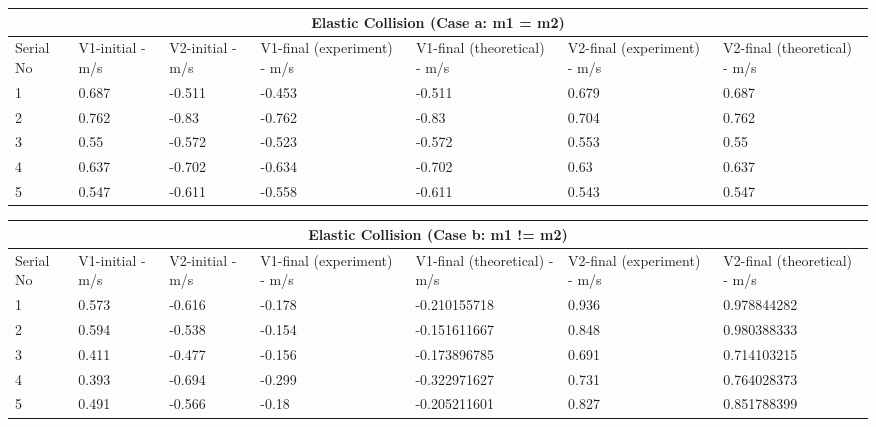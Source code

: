 \begin{center}
    
\begin{adjustbox}{width=1\textwidth}
\begin{tabular}{|l|l|l|l|l|l|l|}
\hline

\multicolumn{7}{|c|}{\textbf{Elastic Collision (Case a: m1 = m2)}} \\ \hline
Serial No & V1-initial - m/s & V2-initial - m/s & V1-final (experiment) - m/s & V1-final (theoretical) - m/s & V2-final (experiment) - m/s & V2-final (theoretical) - m/s \\ \hline
1   & 0.687   & -0.511   & -0.453   & -0.511   & 0.679   & 0.687   \\ \hline
2   & 0.762   & -0.83    & -0.762   & -0.83    & 0.704   & 0.762   \\ \hline
3   & 0.55    & -0.572   & -0.523   & -0.572   & 0.553   & 0.55    \\ \hline
4   & 0.637   & -0.702   & -0.634   & -0.702   & 0.63    & 0.637   \\ \hline
5   & 0.547   & -0.611   & -0.558   & -0.611   & 0.543   & 0.547   \\ \hline
\end{tabular}
\end{adjustbox}
\end{center}

\begin{center}
\begin{adjustbox}{width=1\textwidth}
\begin{tabular}{|l|l|l|l|l|l|l|}
\hline
\multicolumn{7}{|c|}{\textbf{Elastic Collision (Case b: m1 != m2)}} \\ \hline
Serial No & V1-initial - m/s & V2-initial - m/s & V1-final (experiment) - m/s & V1-final (theoretical) - m/s & V2-final (experiment) - m/s & V2-final (theoretical) - m/s \\ \hline
1  & 0.573  & -0.616  & -0.178 & -0.210155718 & 0.936 & 0.978844282 \\ \hline
2  & 0.594  & -0.538  & -0.154 & -0.151611667 & 0.848 & 0.980388333 \\ \hline
3  & 0.411  & -0.477  & -0.156 & -0.173896785 & 0.691 & 0.714103215 \\ \hline
4  & 0.393  & -0.694  & -0.299 & -0.322971627 & 0.731 & 0.764028373 \\ \hline
5  & 0.491  & -0.566  & -0.18  & -0.205211601 & 0.827 & 0.851788399 \\ \hline
\end{tabular}
\end{adjustbox}
\end{center}

